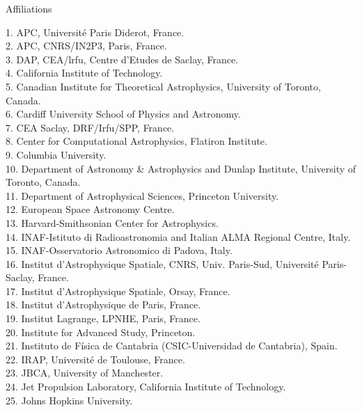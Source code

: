\documentclass[PICOReport.tex]{subfiles}
\begin{document}
\newpage
\Large  {\centerline {Affiliations}}


\begin{multicols}{2}
\raggedright 
\scriptsize {
1. APC, Universit\'e Paris Diderot, France.  \\ 
2. APC, CNRS/IN2P3, Paris, France.  \\
3. DAP, CEA/lrfu, Centre d'Etudes de Saclay, France.  \\
4. California Institute of Technology.  \\
5. Canadian Institute for Theoretical Astrophysics, University of Toronto, Canada.  \\
6. Cardiff University School of Physics and Astronomy.  \\
7. CEA Saclay, DRF/Irfu/SPP, France.  \\
8. Center for Computational Astrophysics, Flatiron Institute.  \\
9. Columbia University.  \\
10. Department of Astronomy \& Astrophysics and Dunlap Institute, University of Toronto, Canada.  \\
11. Department of Astrophysical Sciences, Princeton University.  \\
12. European Space Astronomy Centre.  \\
13. Harvard-Smithsonian Center for Astrophysics.  \\
14. INAF-Istituto di Radioastronomia and Italian ALMA Regional Centre, Italy.  \\
15. INAF-Osservatorio Astronomico di Padova, Italy.  \\
16. Institut d'Astrophysique Spatiale, CNRS, Univ. Paris-Sud, Universit\'e Paris-Saclay, France.  \\
17. Institut d'Astrophysique Spatiale, Orsay, France.  \\
18. Institut d'Astrophysique de Paris, France.  \\
19. Institut Lagrange, LPNHE,  Paris, France.  \\
20. Institute for Advanced Study, Princeton.  \\
21. Instituto de F\'isica de Cantabria (CSIC-Universidad de Cantabria), Spain.  \\
22. IRAP, Universit\'e de Toulouse, France.  \\
23. JBCA, University of Manchester.  \\
24. Jet Propulsion Laboratory, California Institute of Technology.  \\
25. Johns Hopkins University.  \\
}
\end{multicols}
\end{document}

